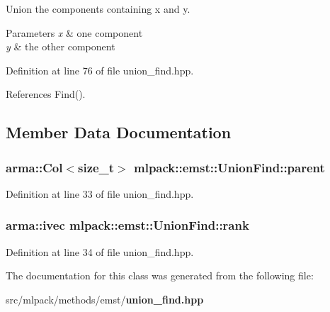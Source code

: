 Union the components containing x and y. 


\begin{DoxyParams}{Parameters}
{\em x} & one component \\
\hline
{\em y} & the other component \\
\hline
\end{DoxyParams}


Definition at line 76 of file union\+\_\+find.\+hpp.



References Find().



\subsection{Member Data Documentation}
\subsubsection[{parent}]{\setlength{\rightskip}{0pt plus 5cm}arma\+::\+Col$<$size\+\_\+t$>$ mlpack\+::emst\+::\+Union\+Find\+::parent\hspace{0.3cm}{\ttfamily [private]}}\label{classmlpack_1_1emst_1_1UnionFind_ab989de421794b4bc4ab930bec5a2c40b}


Definition at line 33 of file union\+\_\+find.\+hpp.

\subsubsection[{rank}]{\setlength{\rightskip}{0pt plus 5cm}arma\+::ivec mlpack\+::emst\+::\+Union\+Find\+::rank\hspace{0.3cm}{\ttfamily [private]}}\label{classmlpack_1_1emst_1_1UnionFind_a19f06f49e59750a0c06c1d781fc31476}


Definition at line 34 of file union\+\_\+find.\+hpp.



The documentation for this class was generated from the following file\+:\begin{DoxyCompactItemize}
\item 
src/mlpack/methods/emst/{\bf union\+\_\+find.\+hpp}\end{DoxyCompactItemize}
